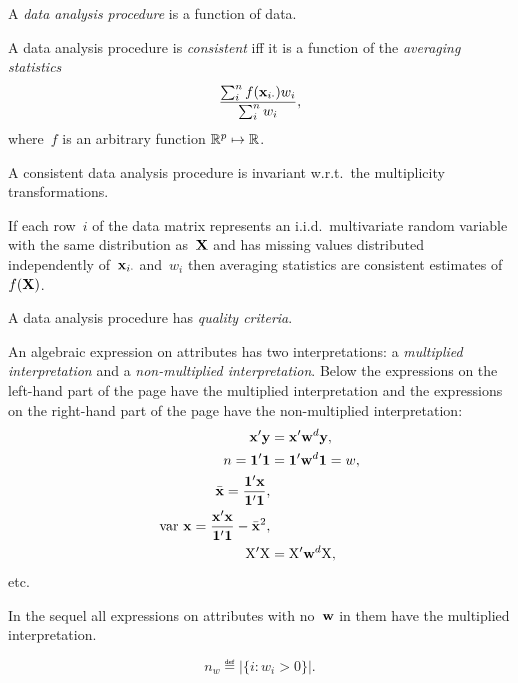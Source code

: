 \documentclass[10pt,a4paper]{article}
\theoremstyle{plain} \newtheorem{Lem}{Lemma}
\begin{document}
A {\em data analysis procedure} is a function of data.

A data analysis procedure is {\em consistent} iff it is a function of the {\em averaging statistics}
$$ \frac {\sum_i^n f(\mathbf x_{i\cdot}) w_i} {\sum_i^n w_i}, $$
where~$f$ is an arbitrary function $\mathbb R^p \mapsto \mathbb R$.

A consistent data analysis procedure is invariant w.r.t.~the multiplicity transformations.

If each row~$i$ of the data matrix represents an i.i.d.~multivariate random variable with the same distribution as~$\mathbf X$
and has missing values distributed independently of~$\mathbf x_{i\cdot}$ and~$w_i$
then averaging statistics are consistent estimates of~$f(\mathbf X)$.


A data analysis procedure has {\em quality criteria}.


An algebraic expression on attributes has two interpretations: a {\em multiplied interpretation} and a {\em non-multiplied interpretation}.
Below the expressions on the  left-hand part of the page have the multiplied interpretation
and   the expressions on the right-hand part of the page have the non-multiplied interpretation:
\begin{align*}
\mathbf x' \mathbf y &= \mathbf x' \mathbf w^d \mathbf y, \\
n = \mathbf 1' \mathbf 1 &= \mathbf 1' \mathbf w^d \mathbf 1 = w, \\
\bar {\mathbf x} = \frac {\mathbf 1' \mathbf x} {\mathbf 1' \mathbf 1},& \\
\mathrm {var} \  \mathbf x = \frac {\mathbf x' \mathbf x} {\mathbf 1' \mathbf 1} - {\bar {\mathbf x}}^2,& \\
\mathrm X' \mathrm X &= \mathrm X' \mathbf w^d \mathrm X,
\end{align*}
etc.

In the sequel all expressions on attributes with no~$\mathbf w$ in them have the multiplied interpretation.

$$ n_w \eqdef |\{i : w_i > 0\}|. $$



\end{document}
